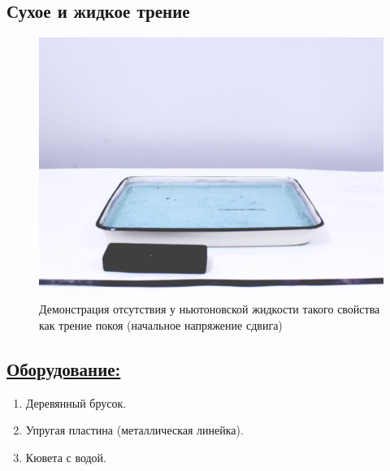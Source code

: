 \documentclass[14pt,a4paper,oneside]{extarticle}	%
\begin{document}

	
\begin{center}
		\subsection*{Сухое и жидкое трение}
\end{center}
	
	\begin{figure}[H] 	%
		\centering 	
		\includegraphics[width=0.9\linewidth]{friction-1.png}
		\caption{Демонстрация отсутствия у ньютоновской жидкости такого свойства как трение покоя (начальное напряжение сдвига)}
		\label{friction-1}
	\end{figure}
	
	\subsection*{\underline{Оборудование:}}
	
	\begin{enumerate} 
		\item Деревянный брусок.
		\item Упругая пластина (металлическая линейка).
		\item Кювета с водой.
		
	\end{enumerate}
\end{document}
